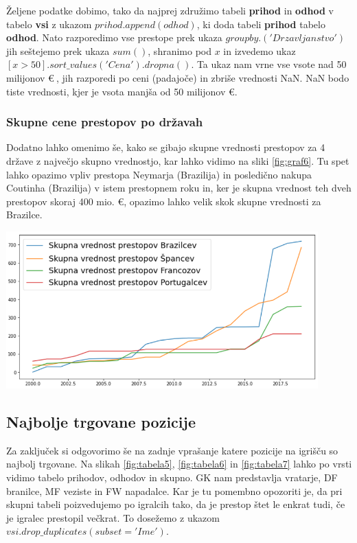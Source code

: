 \documentclass[a4paper, 12pt]{article}
\begin{document}
Željene podatke dobimo, tako da najprej združimo tabeli \textbf{prihod} in \textbf{odhod} v tabelo \textbf{vsi} z ukazom $prihod.append(odhod)$, ki doda tabeli \textbf{prihod} tabelo \textbf{odhod}. 
Nato razporedimo vse prestope prek ukaza $groupby.('Drzavljanstvo')$ jih seštejemo prek ukaza $sum()$, shranimo pod $x$ in izvedemo ukaz $[x>50].sort\_values('Cena').dropna()$. 
Ta ukaz nam vrne vse vsote nad 50 milijonov \euro $\:$, jih razporedi po ceni (padajoče) in zbriše vrednosti NaN. NaN bodo tiste vrednosti, kjer je vsota manjša od 50 milijonov \euro.

\subsubsection{Skupne cene prestopov po državah}
Dodatno lahko omenimo še, kako se gibajo skupne vrednosti prestopov za 4 države z največjo skupno vrednostjo, kar lahko vidimo na sliki \ref{fig:graf6}. Tu spet lahko opazimo vpliv prestopa Neymarja (Brazilija) in posledično nakupa Coutinha (Brazilija) v istem prestopnem roku in, ker je skupna vrednost teh dveh prestopov skoraj 400 mio. \euro, opazimo lahko velik skok skupne vrednosti za Brazilce.

\begin{center}
\includegraphics[width=0.9\textwidth]{graf6}
\label{fig:graf6} 
\end{center}

\subsection{Najbolje trgovane pozicije}
Za zaključek si odgovorimo še na zadnje vprašanje katere pozicije na igrišču so najbolj trgovane. Na slikah \ref{fig:tabela5}, \ref{fig:tabela6} in \ref{fig:tabela7} lahko po vrsti vidimo tabelo prihodov, odhodov in skupno. GK nam predstavlja vratarje, DF branilce, MF veziste in FW napadalce. Kar je tu pomembno opozoriti je, da pri skupni tabeli poizvedujemo po igralcih tako, da je prestop štet le enkrat tudi, če je igralec prestopil večkrat. To dosežemo z ukazom $vsi.drop\_duplicates(subset='Ime')$.\\
\end{document}
